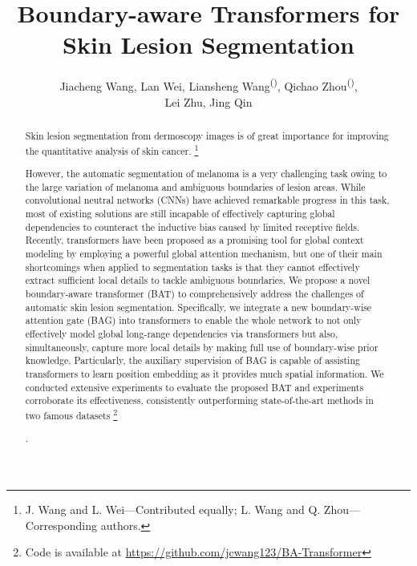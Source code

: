 \documentclass[runningheads]{paper478-llncs}
\newcommand\blfootnote[1]{\begingroup
  \renewcommand\thefootnote{}\footnote{#1}\addtocounter{footnote}{-1}\endgroup
}
\begin{document}
\title{Boundary-aware Transformers for\\ Skin Lesion Segmentation}
\author{Jiacheng Wang,
        Lan Wei, 
        Liansheng Wang\textsuperscript{(\Letter)},
        Qichao Zhou\textsuperscript{(\Letter)}, \\
        Lei Zhu, 
        Jing Qin}
\maketitle              \begin{abstract}
Skin lesion segmentation from dermoscopy images is of great importance for improving the quantitative analysis of skin cancer.\blfootnote{\textsuperscript{} J. Wang and L. Wei---Contributed equally; L. Wang and Q. Zhou---Corresponding authors.} 
However, the automatic segmentation of melanoma is a very challenging task owing to the large variation of melanoma and ambiguous boundaries of lesion areas. 
While convolutional neutral networks (CNNs) have achieved remarkable progress in this task, most of existing solutions are still incapable of effectively capturing global dependencies to counteract the inductive bias caused by limited receptive fields.
Recently, transformers have been proposed as a promising tool for global context modeling by employing a powerful global attention mechanism, but one of their main shortcomings when applied to segmentation tasks is that they cannot effectively extract sufficient local details to tackle ambiguous boundaries.
We propose a novel boundary-aware transformer (BAT) to comprehensively address the challenges of automatic skin lesion segmentation.
Specifically, we integrate a new boundary-wise attention gate (BAG) into transformers to enable the whole network to not only effectively model global long-range dependencies via transformers but also, simultaneously, capture more local details by making full use of boundary-wise prior knowledge.
Particularly, the auxiliary supervision of BAG is capable of assisting transformers to learn position embedding as it provides much spatial information.
We conducted extensive experiments to evaluate the proposed BAT and experiments corroborate its effectiveness, consistently outperforming state-of-the-art methods in two famous datasets\blfootnote{\textsuperscript{} Code is available at \url{https://github.com/jcwang123/BA-Transformer}}. 

\end{abstract}
\end{document}
